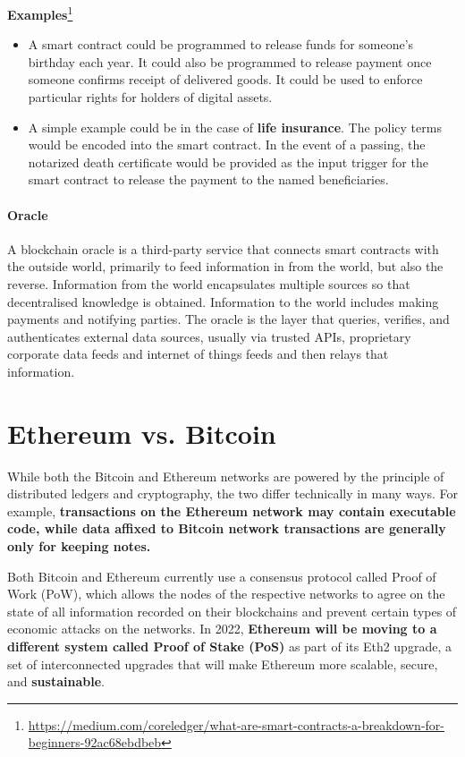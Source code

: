\textbf{Examples}\footnote{\url{https://medium.com/coreledger/what-are-smart-contracts-a-breakdown-for-beginners-92ac68ebdbeb}}
\begin{itemize}
	\item A smart contract could be programmed to release funds for someone's birthday each year. It could also be programmed to release payment once someone confirms receipt of delivered goods. It could be used to enforce particular rights for holders of digital assets.
	\item A simple example could be in the case of \textbf{life insurance}. The policy terms would be encoded into the smart contract. In the event of a passing, the notarized death certificate would be provided as the input trigger for the smart contract to release the payment to the named beneficiaries.
\end{itemize}

\paragraph{Oracle} A blockchain oracle is a third-party service that connects smart contracts with the outside world, primarily to feed information in from the world, but also the reverse. Information from the world encapsulates multiple sources so that decentralised knowledge is obtained. Information to the world includes making payments and notifying parties. The oracle is the layer that queries, verifies, and authenticates external data sources, usually via trusted APIs, proprietary corporate data feeds and internet of things feeds and then relays that information.

\section{Ethereum vs. Bitcoin}

While both the Bitcoin and Ethereum networks are powered by the principle of distributed ledgers and cryptography, the two differ technically in many ways. For example, \textbf{transactions on the Ethereum network may contain executable code, while data affixed to Bitcoin network transactions are generally only for keeping notes.}

Both Bitcoin and Ethereum currently use a consensus protocol called Proof of Work (PoW), which allows the nodes of the respective networks to agree on the state of all information recorded on their blockchains and prevent certain types of economic attacks on the networks. In 2022, \textbf{Ethereum will be moving to a different system called Proof of Stake (PoS)} as part of its Eth2 upgrade, a set of interconnected upgrades that will make Ethereum more scalable, secure, and \textbf{sustainable}.

